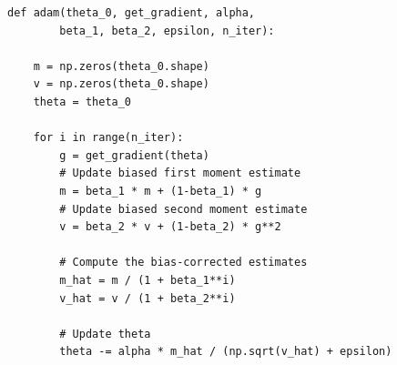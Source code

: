 \begin{listing}
	\begin{verbatim}
def adam(theta_0, get_gradient, alpha,
		beta_1, beta_2, epsilon, n_iter):

	m = np.zeros(theta_0.shape)
	v = np.zeros(theta_0.shape)
	theta = theta_0

	for i in range(n_iter):
		g = get_gradient(theta)
		# Update biased first moment estimate
		m = beta_1 * m + (1-beta_1) * g
		# Update biased second moment estimate
		v = beta_2 * v + (1-beta_2) * g**2

		# Compute the bias-corrected estimates
		m_hat = m / (1 + beta_1**i)
		v_hat = v / (1 + beta_2**i)

		# Update theta
		theta -= alpha * m_hat / (np.sqrt(v_hat) + epsilon)
	\end{verbatim}
	\caption{%
		Pseudocode for the ADAM algorithm. See \cite{kingma2017adam} for a more
		in depth discussion of the algorithm.
	}
	\label{lst:adam}
\end{listing}

